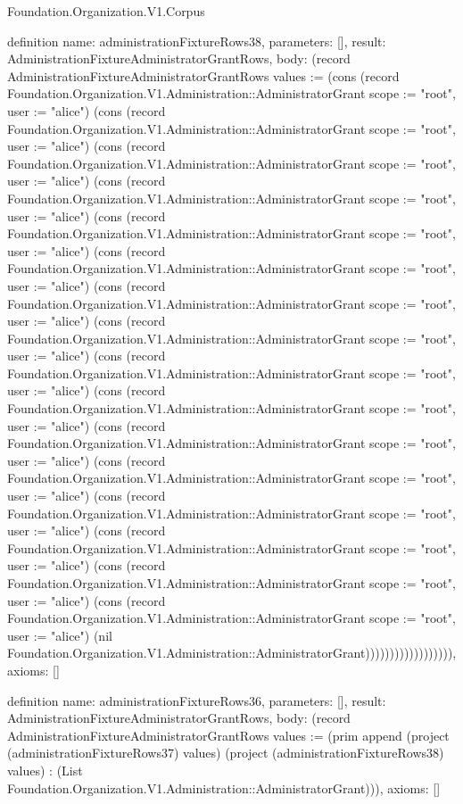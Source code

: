 \begin{lexlean}{Foundation.Organization.V1.Corpus}
\begin{semanticmodule}
definition{
  name: administrationFixtureRows38,
  parameters: [],
  result: AdministrationFixtureAdministratorGrantRows,
  body: (record AdministrationFixtureAdministratorGrantRows {values := (cons (record Foundation.Organization.V1.Administration::AdministratorGrant {scope := "root", user := "alice"}) (cons (record Foundation.Organization.V1.Administration::AdministratorGrant {scope := "root", user := "alice"}) (cons (record Foundation.Organization.V1.Administration::AdministratorGrant {scope := "root", user := "alice"}) (cons (record Foundation.Organization.V1.Administration::AdministratorGrant {scope := "root", user := "alice"}) (cons (record Foundation.Organization.V1.Administration::AdministratorGrant {scope := "root", user := "alice"}) (cons (record Foundation.Organization.V1.Administration::AdministratorGrant {scope := "root", user := "alice"}) (cons (record Foundation.Organization.V1.Administration::AdministratorGrant {scope := "root", user := "alice"}) (cons (record Foundation.Organization.V1.Administration::AdministratorGrant {scope := "root", user := "alice"}) (cons (record Foundation.Organization.V1.Administration::AdministratorGrant {scope := "root", user := "alice"}) (cons (record Foundation.Organization.V1.Administration::AdministratorGrant {scope := "root", user := "alice"}) (cons (record Foundation.Organization.V1.Administration::AdministratorGrant {scope := "root", user := "alice"}) (cons (record Foundation.Organization.V1.Administration::AdministratorGrant {scope := "root", user := "alice"}) (cons (record Foundation.Organization.V1.Administration::AdministratorGrant {scope := "root", user := "alice"}) (cons (record Foundation.Organization.V1.Administration::AdministratorGrant {scope := "root", user := "alice"}) (cons (record Foundation.Organization.V1.Administration::AdministratorGrant {scope := "root", user := "alice"}) (cons (record Foundation.Organization.V1.Administration::AdministratorGrant {scope := "root", user := "alice"}) (nil Foundation.Organization.V1.Administration::AdministratorGrant)))))))))))))))))}),
  axioms: []
}

definition{
  name: administrationFixtureRows36,
  parameters: [],
  result: AdministrationFixtureAdministratorGrantRows,
  body: (record AdministrationFixtureAdministratorGrantRows {values := (prim append (project (administrationFixtureRows37) values) (project (administrationFixtureRows38) values) : (List Foundation.Organization.V1.Administration::AdministratorGrant))}),
  axioms: []
}


\end{semanticmodule}
\end{lexlean}
